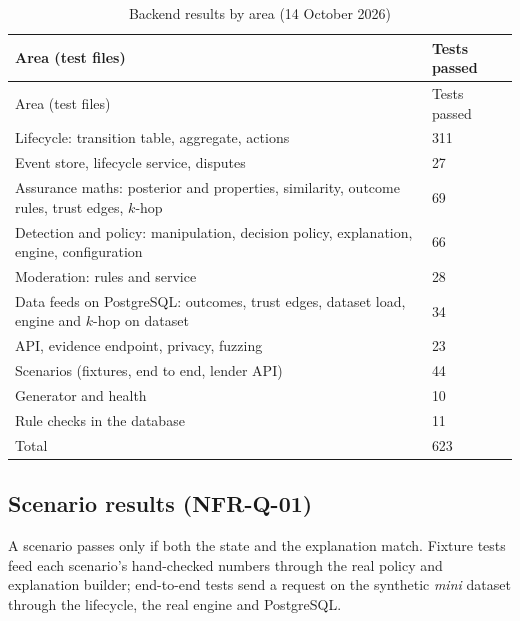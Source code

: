\begingroup
\begin{longtable}{@{}L{294pt}L{70pt}@{}}
\caption{Backend results by area (14 October 2026)}\label{tab:backend-results-area-14}\\
\toprule
Area (test files) & Tests passed \\
\midrule
\endfirsthead
\toprule
Area (test files) & Tests passed \\
\midrule
\endhead
\bottomrule
\endlastfoot
Lifecycle: transition table, aggregate, actions & 311 \\
Event store, lifecycle service, disputes & 27 \\
Assurance maths: posterior and properties, similarity, outcome rules, trust edges, $k$-hop & 69 \\
Detection and policy: manipulation, decision policy, explanation, engine, configuration & 66 \\
Moderation: rules and service & 28 \\
Data feeds on PostgreSQL: outcomes, trust edges, dataset load, engine and $k$-hop on dataset & 34 \\
API, evidence endpoint, privacy, fuzzing & 23 \\
Scenarios (fixtures, end to end, lender API) & 44 \\
Generator and health & 10 \\
Rule checks in the database & 11 \\
\midrule
Total & 623 \\
\end{longtable}
\endgroup
\subsection{Scenario results (NFR-Q-01)}\label{sec:scenario-results-nfr-q-01}
A scenario passes only if both the state and the explanation match. Fixture tests feed each scenario's hand-checked numbers through the real policy and explanation builder; end-to-end tests send a request on the synthetic \textit{mini} dataset through the lifecycle, the real engine and PostgreSQL.


